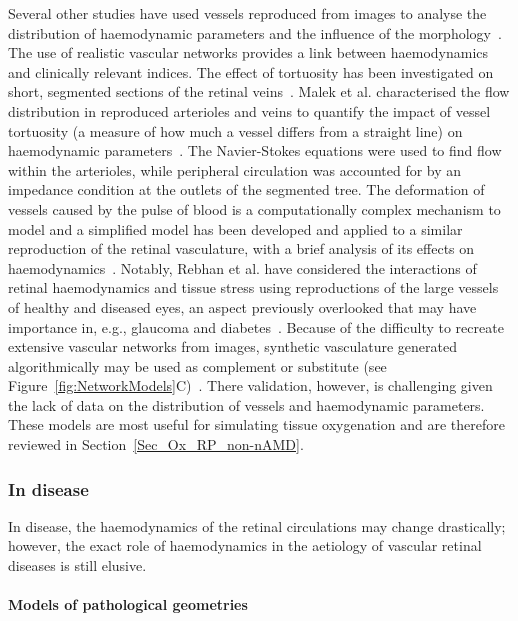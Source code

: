 \documentclass{article}
\begin{document}
Several other studies have used vessels reproduced from images to analyse the distribution of haemodynamic parameters and the influence of the morphology~\cite{Ganesan_2010,Malek_2014,Malek_2015,Rebhan_2019}.
The use of realistic vascular networks provides a link between haemodynamics and clinically relevant indices.
The effect of tortuosity has been investigated on short, segmented sections of the retinal veins~\cite{Malek_2014}.
Malek et al. characterised the flow distribution in reproduced arterioles and veins to quantify the impact of vessel tortuosity (a measure of how much a vessel differs from a straight line) on haemodynamic parameters~\cite{Malek_2014,Malek_2015}.
The Navier-Stokes equations were used to find flow within the arterioles, while peripheral circulation was accounted for by an impedance condition at the outlets of the segmented tree.
The deformation of vessels caused by the pulse of blood is a computationally complex mechanism to model and a simplified model has been developed and applied to a similar reproduction of the retinal vasculature, with a brief analysis of its effects on haemodynamics~\cite{Aletti_2016}.
Notably, Rebhan et al. have considered the interactions of retinal haemodynamics and tissue stress using reproductions of the large vessels of healthy and diseased eyes, an aspect previously overlooked that may have importance in, e.g., glaucoma and diabetes~\cite{Rebhan_2019}.
Because of the difficulty to recreate extensive vascular networks from images, synthetic vasculature generated algorithmically may be used as complement or substitute (see Figure~\ref{fig:NetworkModels}C)~\cite{Causin_2015,Chuangsuwanich_2016,Fry_et_al_2018,Walpole_2017}.
There validation, however, is challenging given the lack of data on the distribution of vessels and haemodynamic parameters.
These models are most useful for simulating tissue oxygenation and are therefore reviewed in Section~\ref{Sec_Ox_RP_non-nAMD}.

\subsubsection{In disease} \label{sec:InDisease}

In disease, the haemodynamics of the retinal circulations may change drastically; however, the exact role of haemodynamics in the aetiology of vascular retinal diseases is still elusive.

\paragraph*{Models of pathological geometries} 
\end{document}
